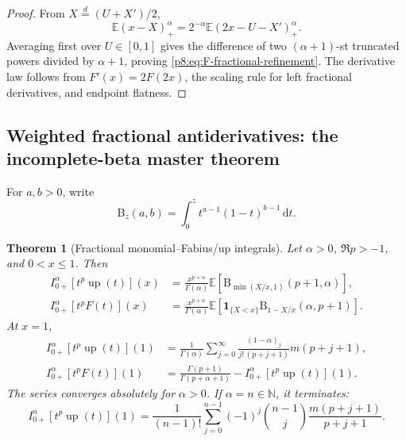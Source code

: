 \documentclass[11pt,oneside]{article}
\newtheorem{theorem}{Theorem}[section]
\theoremstyle{definition}
\theoremstyle{remark}
\newcommand{\Up}{\operatorname{up}}
\newcommand{\E}{\mathbb E}
\newcommand{\N}{\mathbb N}
\newcommand{\dd}{\,\mathrm d}
\newcommand{\1}{\mathbf 1}
\begin{document}
\begin{proof}
From \(X\stackrel d=(U+X')/2\),
\[
 \E(x-X)_+^\alpha
 =2^{-\alpha}\E(2x-U-X')_+^\alpha.
\]
Averaging first over \(U\in[0,1]\) gives the difference of two
\((\alpha+1)\)-st truncated powers divided by \(\alpha+1\), proving
\eqref{p8:eq:F-fractional-refinement}.  The derivative law follows from
\(F'(x)=2F(2x)\), the scaling rule for left fractional derivatives, and endpoint
flatness.
\end{proof}

\subsection{Weighted fractional antiderivatives: the incomplete-beta master theorem}

For \(a,b>0\), write
\begin{equation}
 \mathrm B_z(a,b)=\int_0^z t^{a-1}(1-t)^{b-1}\dd t.
 \label{p8:eq:incomplete-beta}
\end{equation}

\begin{theorem}[Fractional monomial--Fabius/up integrals]
\label{p8:thm:weighted-fractional-master}
Let \(\alpha>0\), \(\Re p>-1\), and \(0<x\le1\).  Then
\begin{align}
 I_{0+}^{\alpha}[t^p\Up(t)](x)
 &=\frac{x^{p+\alpha}}{\Gamma(\alpha)}
 \E\!\left[
 \mathrm B_{\min(X/x,1)}(p+1,\alpha)
 \right],
 \label{p8:eq:weighted-up-fractional}\\
 I_{0+}^{\alpha}[t^pF(t)](x)
 &=\frac{x^{p+\alpha}}{\Gamma(\alpha)}
 \E\!\left[
 \mathbf1_{\{X<x\}}
 \mathrm B_{1-X/x}(\alpha,p+1)
 \right].
 \label{p8:eq:weighted-F-fractional}
\end{align}
At \(x=1\),
\begin{align}
 I_{0+}^{\alpha}[t^p\Up(t)](1)
 &=\frac1{\Gamma(\alpha)}
 \sum_{j=0}^{\infty}
 \frac{(1-\alpha)_j}{j!\,(p+j+1)}m(p+j+1),
 \label{p8:eq:weighted-up-series}\\
 I_{0+}^{\alpha}[t^pF(t)](1)
 &=\frac{\Gamma(p+1)}{\Gamma(p+\alpha+1)}
 -I_{0+}^{\alpha}[t^p\Up(t)](1).
 \label{p8:eq:weighted-F-series}
\end{align}
The series converges absolutely for \(\alpha>0\).  If \(\alpha=n\in\N\), it
terminates:
\begin{equation}
 I_{0+}^{n}[t^p\Up(t)](1)
 =\frac1{(n-1)!}
 \sum_{j=0}^{n-1}(-1)^j\binom{n-1}{j}
 \frac{m(p+j+1)}{p+j+1}.
 \label{p8:eq:weighted-integer-terminating}
\end{equation}
\statusprovedPartll
\end{theorem}
\end{document}

